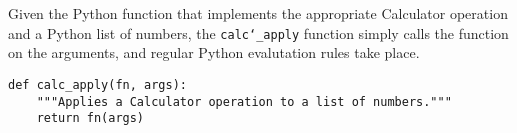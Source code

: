 Given the Python function that implements the appropriate Calculator operation
and a Python list of numbers, the {\tt calc\char`_apply} function simply calls
the function on the arguments, and regular Python evalutation rules take place.

\begin{lstlisting}
def calc_apply(fn, args):
    """Applies a Calculator operation to a list of numbers."""
    return fn(args)
\end{lstlisting}

